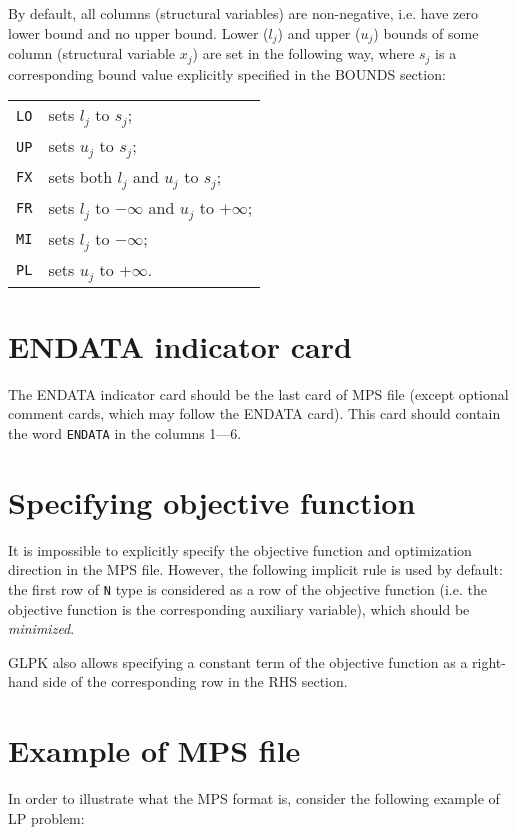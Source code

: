 By default, all columns (structural variables) are non-negative, i.e.
have zero lower bound and no upper bound. Lower ($l_j$) and upper
($u_j$) bounds of some column (structural variable $x_j$) are set in the
following way, where $s_j$ is a corresponding bound value explicitly
specified in the BOUNDS section:

\begin{tabular}{@{}ll}
\verb|LO| & sets $l_j$ to $s_j$; \\
\verb|UP| & sets $u_j$ to $s_j$; \\
\verb|FX| & sets both $l_j$ and $u_j$ to $s_j$; \\
\verb|FR| & sets $l_j$ to $-\infty$ and $u_j$ to $+\infty$; \\
\verb|MI| & sets $l_j$ to $-\infty$; \\
\verb|PL| & sets $u_j$ to $+\infty$. \\
\end{tabular}

\section{ENDATA indicator card}

The ENDATA indicator card should be the last card of MPS file (except
optional comment cards, which may follow the ENDATA card). This card
should contain the word \verb|ENDATA| in the columns 1---6.

\section{Specifying objective function}

It is impossible to explicitly specify the objective function and
optimization direction in the MPS file. However, the following implicit
rule is used by default: the first row of \verb|N| type is considered
as a row of the objective function (i.e. the objective function is the
corresponding auxiliary variable), which should be {\it minimized}.

GLPK also allows specifying a constant term of the objective function
as a right-hand side of the corresponding row in the RHS section.

\section{Example of MPS file}
\label{secmpsex}

In order to illustrate what the MPS format is, consider the following
example of LP problem:

